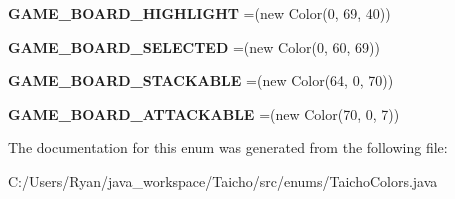 \begin{DoxyCompactItemize}
\item 
\hypertarget{enumenums_1_1_taicho_colors_aa76dabf852144f925c566f79245a448c}{{\bfseries G\-A\-M\-E\-\_\-\-B\-O\-A\-R\-D\-\_\-\-H\-I\-G\-H\-L\-I\-G\-H\-T} =(new Color(0, 69, 40))}\label{enumenums_1_1_taicho_colors_aa76dabf852144f925c566f79245a448c}

\item 
\hypertarget{enumenums_1_1_taicho_colors_aaa0ceb16a8f5e78c82a3554c4c9a9400}{{\bfseries G\-A\-M\-E\-\_\-\-B\-O\-A\-R\-D\-\_\-\-S\-E\-L\-E\-C\-T\-E\-D} =(new Color(0, 60, 69))}\label{enumenums_1_1_taicho_colors_aaa0ceb16a8f5e78c82a3554c4c9a9400}

\item 
\hypertarget{enumenums_1_1_taicho_colors_afdbb80c73e20b1fa72b4b9e5169d1a50}{{\bfseries G\-A\-M\-E\-\_\-\-B\-O\-A\-R\-D\-\_\-\-S\-T\-A\-C\-K\-A\-B\-L\-E} =(new Color(64, 0, 70))}\label{enumenums_1_1_taicho_colors_afdbb80c73e20b1fa72b4b9e5169d1a50}

\item 
\hypertarget{enumenums_1_1_taicho_colors_a783615876bd8a4e1f7a4ebc00ee288be}{{\bfseries G\-A\-M\-E\-\_\-\-B\-O\-A\-R\-D\-\_\-\-A\-T\-T\-A\-C\-K\-A\-B\-L\-E} =(new Color(70, 0, 7))}\label{enumenums_1_1_taicho_colors_a783615876bd8a4e1f7a4ebc00ee288be}

\end{DoxyCompactItemize}


The documentation for this enum was generated from the following file\-:\begin{DoxyCompactItemize}
\item 
C\-:/\-Users/\-Ryan/java\-\_\-workspace/\-Taicho/src/enums/Taicho\-Colors.\-java\end{DoxyCompactItemize}
